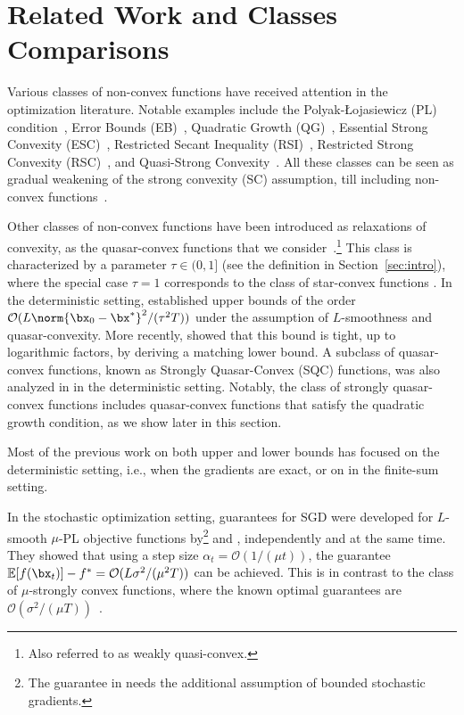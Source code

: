 \section{Related Work and Classes Comparisons}
\label{sec:comparisons}
	Various classes of non-convex functions have received attention in the optimization literature. Notable examples include the Polyak-Łojasiewicz (PL) condition~\citep{polyak1963gradient}, Error Bounds (EB)~\citep{luo1993error}, Quadratic Growth (QG)~\citep{anitescu2000degenerate}, Essential Strong Convexity (ESC)~\citep{liu2014asynchronous}, Restricted Secant Inequality (RSI)~\citep{polyak1963gradient}, Restricted Strong Convexity (RSC)~\citep{zhang2013gradient}, and Quasi-Strong Convexity~\citep{necoara2019linear}. All these classes can be seen as gradual weakening of the strong convexity (SC) assumption, till including non-convex functions~\citep{karimi2016linear}.
	
	Other classes of non-convex functions have been introduced as relaxations of convexity, as the quasar-convex functions that we consider~\citep{hardt2018gradient, hinder2020near}.\footnote{Also referred to as weakly quasi-convex.}
	This class is characterized by a parameter $\tau \in (0,1]$ (see the definition in Section~\ref{sec:intro}), where the special case $\tau = 1$ corresponds to the class of star-convex functions \citep{nesterov2006cubic}. 	In the deterministic setting, \citet{guminov2023accelerated, nesterov2021primal} established upper bounds of the order $\mathcal{O}(L\norm{\bx_0 - \bx^*}^2/(\tau^2 T))$ under the assumption of $L$-smoothness and quasar-convexity. More recently, \citet{hinder2020near} showed that this bound is tight, up to logarithmic factors, by deriving a matching lower bound.    
	A subclass of quasar-convex functions, known as Strongly Quasar-Convex (SQC) functions, was also analyzed in \citet{hinder2020near} in the deterministic setting. 
	Notably, the class of strongly quasar-convex functions includes quasar-convex functions that satisfy the quadratic growth condition, as we show later in this section.
	
	Most of the previous work on both upper and lower bounds has focused on the deterministic setting, i.e., when the gradients are exact, or on in the finite-sum setting.
		
	In the stochastic optimization setting,   guarantees for SGD were developed for $L$-smooth $\mu$-PL objective functions by\footnote{The guarantee in \citet{karimi2016linear} needs the additional assumption of bounded stochastic gradients.} \cite{li2021second} and \citet{khaled2020better}, independently and at the same time. They showed that using a step size $\alpha_t = \mathcal{O}(1/(\mu t))$, the guarantee $\mathbb{E}[f(\bx_t)] - f^* = \mathcal{O}(L\sigma^2/(\mu^2 T))$ can be achieved. This is in contrast to the class of $\mu$-strongly convex functions, where the known optimal guarantees are $\mathcal{O}(\sigma^2/(\mu T))$~\citep{agarwal2009information, raginsky2011information}. 
	
